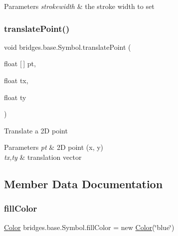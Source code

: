 \begin{DoxyParams}{Parameters}
{\em strokewidth} & the stroke width to set \\
\hline
\end{DoxyParams}
\mbox{\label{classbridges_1_1base_1_1_symbol_affb384e1e7e22d7bcb6ca0bf0d4ebbc3}} 
\subsubsection{\texorpdfstring{translate\+Point()}{translatePoint()}}
{\footnotesize\ttfamily void bridges.\+base.\+Symbol.\+translate\+Point (\begin{DoxyParamCaption}\item[{float \mbox{[}$\,$\mbox{]}}]{pt,  }\item[{float}]{tx,  }\item[{float}]{ty }\end{DoxyParamCaption})\hspace{0.3cm}{\ttfamily [protected]}}

Translate a 2D point 
\begin{DoxyParams}{Parameters}
{\em pt} & 2D point (x, y) \\
\hline
{\em tx,ty} & translation vector \\
\hline
\end{DoxyParams}


\subsection{Member Data Documentation}
\mbox{\label{classbridges_1_1base_1_1_symbol_a44f00712b6c584c7778ed9de4c394cbf}} 
\subsubsection{\texorpdfstring{fill\+Color}{fillColor}}
{\footnotesize\ttfamily \mbox{\hyperlink{classbridges_1_1base_1_1_color}{Color}} bridges.\+base.\+Symbol.\+fill\+Color = new \mbox{\hyperlink{classbridges_1_1base_1_1_color}{Color}}(\char`\"{}blue\char`\"{})\hspace{0.3cm}{\ttfamily [protected]}}

